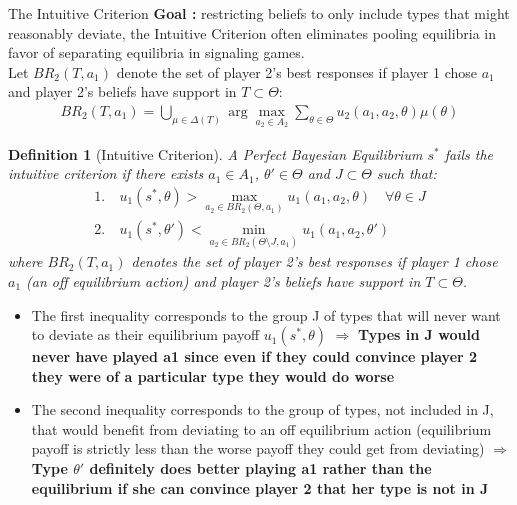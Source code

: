 \documentclass{article}
\newtheorem{definition}{Definition}[section]
\begin{document}
    \begin{simplebox}{The Intuitive Criterion }
        \textbf{Goal :} restricting beliefs to only include types that might reasonably deviate, the Intuitive Criterion often eliminates pooling equilibria in favor of separating equilibria in signaling games. \\
        Let $BR_2(T,a_1)$ denote the set of player 2's best responses if player 1 chose $a_1$ and player 2's beliefs have support in $T \subset \Theta$:  
            \begin{align}  
            BR_2(T,a_1) = \bigcup_{\mu \in \Delta(T)} \arg\max_{a_2 \in A_2} \sum_{\theta \in \Theta} u_2(a_1, a_2, \theta)\mu(\theta)
            \end{align}  
        \begin{definition}[Intuitive Criterion]  
                A Perfect Bayesian Equilibrium $s^*$ fails the intuitive criterion if there exists $a_1 \in A_1$, $\theta' \in \Theta$ and $J \subset \Theta$ such that:  
                \begin{align}  
                1.\ & u_1(s^*, \theta) > \max_{a_2 \in BR_2(\Theta, a_1)} u_1(a_1, a_2, \theta) \quad \forall \theta \in J \\  
                2.\ & u_1(s^*, \theta') < \min_{a_2 \in BR_2(\Theta \setminus J, a_1)} u_1(a_1, a_2, \theta')  
                \end{align}  
                where $BR_2(T, a_1)$ denotes the set of player 2's best responses if player 1 chose $a_1$ (an off equilibrium action) and player 2's beliefs have support in $T \subset \Theta$.  
            \end{definition}  
        \begin{itemize}
            \item The first inequality corresponds to the group J of types that will never want to deviate as their equilibrium payoff $u_1(s^*,\theta)$ $\Rightarrow$ \textbf{Types in J would never have played a1 since even if they could convince player 2 they were of a particular type they would do worse}
            \item The second inequality corresponds to the group of types, not included in J,  that would benefit from deviating to an off equilibrium action (equilibrium payoff is strictly less than the worse payoff they could get from deviating) $\Rightarrow$ \textbf{Type $\theta'$ definitely does better playing a1 rather than the equilibrium if she can convince player 2 that her type is not in J}
        \end{itemize}

\end{simplebox}
\end{document}
